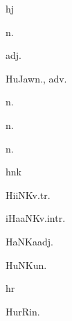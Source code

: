 \begin{multicols*}{2}
\begin{dictroot}{h}{j}
\begin{dictentry}{}{n.}
    \end{dictentry}
    \begin{dictentry}{}{adj.}
    \end{dictentry}
    \begin{dictentry}{HuJaw}{n., adv.}
    \end{dictentry}
    \begin{dictentry}{}{n.}
    \end{dictentry}
    \begin{dictentry}{}{n.}
    \end{dictentry}
    \begin{dictentry}{}{n.}
    \end{dictentry}
\end{dictroot}

\begin{dictroot}{h}{nk}
    \begin{dictentry}{HiiNK}{v.tr.}
    \end{dictentry}
    \begin{dictentry}{iHaaNK}{v.intr.}
    \end{dictentry}
    \begin{dictentry}{HaNKa}{adj.}
    \end{dictentry}
    \begin{dictentry}{HuNKu}{n.}
    \end{dictentry}
\end{dictroot}

\begin{dictroot}{h}{r}
    \begin{dictentry}{HurRi}{n.}
    \end{dictentry}
\end{dictroot}


\end{multicols*}
